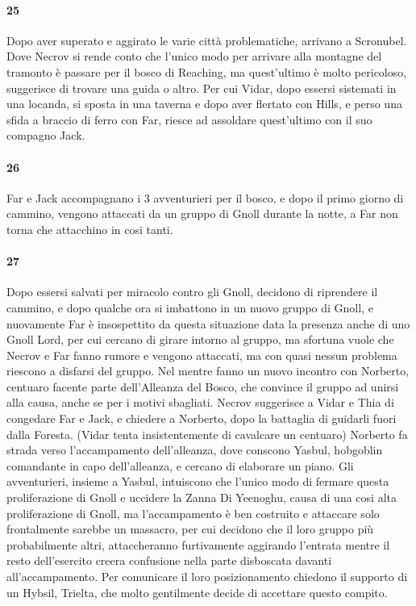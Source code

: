 \documentclass{article}
\begin{document}
      \paragraph{25}Dopo aver superato e aggirato le varie città problematiche, arrivano a Scronubel. Dove Necrov si rende conto che l'unico modo per arrivare alla montagne del tramonto è passare per il bosco di Reaching, ma quest'ultimo è molto pericoloso, suggerisce di trovare una guida o altro. Per cui Vidar, dopo essersi sistemati in una locanda, si sposta in una taverna e dopo aver flertato con Hills, e perso una sfida a braccio di ferro con Far, riesce ad assoldare quest'ultimo con il suo compagno Jack. 
      \paragraph{26} Far e Jack accompagnano i 3 avventurieri per il bosco, e dopo il primo giorno di cammino, vengono attaccati da un gruppo di Gnoll durante la notte, a Far non torna che attacchino in cosi tanti.
      \paragraph{27} Dopo essersi salvati per miracolo contro gli Gnoll, decidono di riprendere il cammino, e dopo qualche ora si imbattono in un nuovo gruppo di Gnoll, e nuovamente Far è insospettito da questa situazione data la presenza anche di uno Gnoll Lord, per cui cercano di girare intorno al gruppo, ma sfortuna vuole che Necrov e Far fanno rumore e vengono attaccati, ma con quasi nessun problema riescono a disfarsi del gruppo. Nel mentre fanno un nuovo incontro con Norberto, centuaro facente parte dell'Alleanza del Bosco, che convince il gruppo ad unirsi alla causa, anche se per i motivi sbagliati. Necrov suggerisce a Vidar e Thia di congedare Far e Jack, e chiedere a Norberto, dopo la battaglia di guidarli fuori dalla Foresta. (Vidar tenta insistentemente di cavalcare un centuaro) Norberto fa strada verso l'accampamento dell'alleanza, dove conscono Yasbul, hobgoblin comandante in capo dell'alleanza, e cercano di elaborare un piano. Gli avventurieri, insieme a Yasbul, intuiscono che l'unico modo di fermare questa proliferazione di Gnoll e uccidere la Zanna Di Yeenoghu, causa di una cosi alta proliferazione di Gnoll, ma l'accampamento è ben costruito e attaccare solo frontalmente sarebbe un massacro, per cui decidono che il loro gruppo più probabilmente altri, attaccheranno furtivamente aggirando l'entrata mentre il resto dell'esercito creera confusione nella parte disboscata davanti all'accampamento. Per comunicare il loro posizionamento chiedono il supporto di un Hybsil, Trielta, che molto gentilmente decide di accettare questo compito. 
\end{document}
